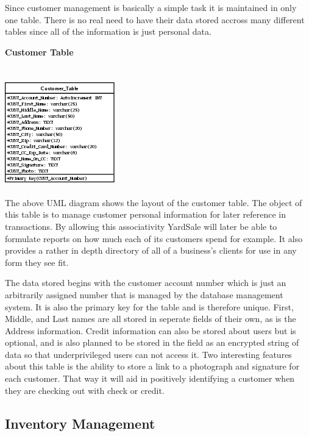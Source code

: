 \documentclass{report}
\begin{document}
\begin{itemize}
        Since customer management is basically a simple task it is maintained in only
        one table. There is no real need to have their data stored accross many
        different tables since all of the information is just personal data.

        {\bf Customer Table}\\
        \\
        \\
        \includegraphics{Tables/CustomerTable.png}\\
        \\
        The above UML diagram shows the layout of the customer table. The object of this
        table is to manage customer personal information for later reference in
        transactions. By allowing this associativity YardSale will later be able to
        formulate reports on how much each of its customers spend for example. It also
        provides a rather in depth directory of all of a business's clients for use
        in any form they see fit.

        The data stored begins with the customer account number which is just an
        arbitrarily assigned number that is managed by the database management
        system. It is also the primary key for the table and is therefore unique.
        First, Middle, and Last names are all stored in seperate fields of their own,
        as is the Address information. Credit information can also be stored about users
        but is optional, and is also planned to be stored in the field as an encrypted
        string of data so that underprivileged users can not access it. Two interesting
        features about this table is the ability to store a link to a photograph and
        signature for each customer. That way it will aid in positively identifying a
        customer when they are checking out with check or credit.


        \newpage

        \subsection{Inventory Management}


\end{itemize}
\end{document}
